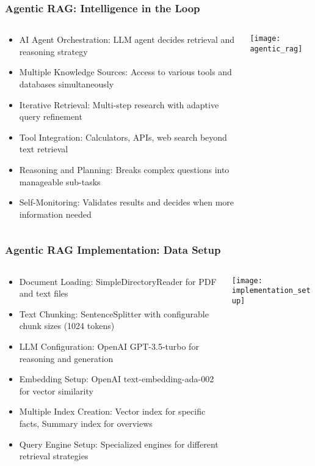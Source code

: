 \begin{frame}[fragile]\frametitle{Agentic RAG: Intelligence in the Loop}
\begin{columns}
    \begin{column}[T]{0.6\linewidth}
      \begin{itemize}
		\item AI Agent Orchestration: LLM agent decides retrieval and reasoning strategy
		\item Multiple Knowledge Sources: Access to various tools and databases simultaneously
		\item Iterative Retrieval: Multi-step research with adaptive query refinement
		\item Tool Integration: Calculators, APIs, web search beyond text retrieval
		\item Reasoning and Planning: Breaks complex questions into manageable sub-tasks
		\item Self-Monitoring: Validates results and decides when more information needed
	  \end{itemize}
    \end{column}
    \begin{column}[T]{0.4\linewidth}
		\begin{center}
		\texttt{[image: agentic\_rag]}
		\end{center}	
    \end{column}
  \end{columns}
\end{frame}

\begin{frame}[fragile]\frametitle{Agentic RAG Implementation: Data Setup}
\begin{columns}
    \begin{column}[T]{0.6\linewidth}
      \begin{itemize}
		\item Document Loading: SimpleDirectoryReader for PDF and text files
		\item Text Chunking: SentenceSplitter with configurable chunk sizes (1024 tokens)
		\item LLM Configuration: OpenAI GPT-3.5-turbo for reasoning and generation
		\item Embedding Setup: OpenAI text-embedding-ada-002 for vector similarity
		\item Multiple Index Creation: Vector index for specific facts, Summary index for overviews
		\item Query Engine Setup: Specialized engines for different retrieval strategies
	  \end{itemize}
    \end{column}
    \begin{column}[T]{0.4\linewidth}
		\begin{center}
		\texttt{[image: implementation\_setup]}
		\end{center}	
    \end{column}
  \end{columns}
\end{frame}

